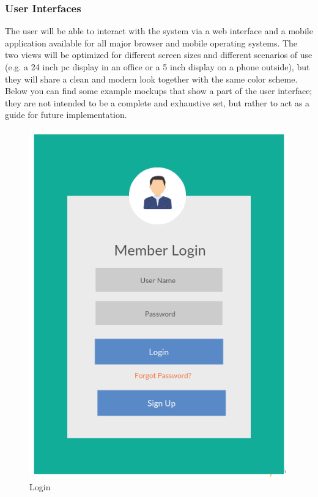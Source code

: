 \subsubsection{User Interfaces}

The user will be able to interact with the system via a web interface and a mobile application available for all major browser and mobile operating systems. The two views will be optimized for different screen sizes and different scenarios of use (e.g. a 24 inch pc display in an office or a 5 inch display on a phone outside), but they will share a clean and modern look together with the same color scheme.
\\ [0.2 cm]
Below you can find some example mockups that show a part of the user interface; they are not intended to be a complete and exhaustive set, but rather to act as a guide for future implementation.
\\ [0.5 cm]

\begin{figure}[!h]
\centering\includegraphics[scale=0.3]{Images/Placeholder.png}{}
\caption{Login}
\end{figure}


